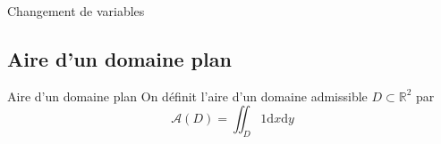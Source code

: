 \begin{Theorem}{Changement de variables}{}

\end{Theorem}

\subsection{Aire d'un domaine plan} %
\label{sub:Aire d'un domaine plan}
\begin{Definition}[colbacktitle=red!75!black]{Aire d'un domaine plan}{}
On définit l'aire d'un domaine admissible $D \subset \mathbb{R} ^{2}$ par 
\begin{equation}
  \mathcal{A} (D) = \iint _{D} 1 \mathrm{d}x \mathrm{d}y
\end{equation}

\end{Definition}







